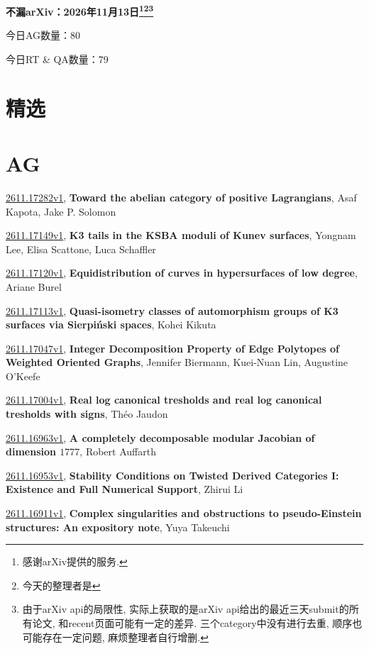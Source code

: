 \documentclass[9pt, a4paper]{article}
\theoremstyle{plain}
\theoremstyle{definition}
\theoremstyle{remark}
\newcommand{\arxiv}[3]{\href{https://arxiv.org/abs/#1}{#1}, \textbf{\textcolor{arxivblue}{#2}}, #3}
\newcommand{\AGnumber}{80}
\newcommand{\RTQAnumber}{79}
\newcommand{\NewestDate}{2026年11月13日}
\newcommand{\todayarXiver}{} %
\begin{document}
\begin{center}
    \Huge\textbf{不漏arXiv：\NewestDate\footnote{感谢arXiv提供的服务.}\footnote{今天的整理者是\todayarXiver}\footnote{由于arXiv api的局限性, 实际上获取的是arXiv api给出的最近三天submit的所有论文, 和recent页面可能有一定的差异. 三个category中没有进行去重, 顺序也可能存在一定问题, 麻烦整理者自行增删.}} \\
\end{center}

\setcounter{section}{-1}

\begin{center}
    今日AG数量：\AGnumber
    
    今日RT \& QA数量：\RTQAnumber
    
\end{center}


\section{精选}


\section{AG}
\arxiv{2611.17282v1}{Toward the abelian category of positive Lagrangians}{Asaf Kapota, Jake P. Solomon}

\arxiv{2611.17149v1}{K3 tails in the KSBA moduli of Kunev surfaces}{Yongnam Lee, Elisa Scattone, Luca Schaffler}

\arxiv{2611.17120v1}{Equidistribution of curves in hypersurfaces of low degree}{Ariane Burel}

\arxiv{2611.17113v1}{Quasi-isometry classes of automorphism groups of K3 surfaces via Sierpiński spaces}{Kohei Kikuta}

\arxiv{2611.17047v1}{Integer Decomposition Property of Edge Polytopes of Weighted Oriented Graphs}{Jennifer Biermann, Kuei-Nuan Lin, Augustine O'Keefe}

\arxiv{2611.17004v1}{Real log canonical tresholds and real log canonical tresholds with signs}{Th{é}o Jaudon}

\arxiv{2611.16963v1}{A completely decomposable modular Jacobian of dimension $1777$}{Robert Auffarth}

\arxiv{2611.16953v1}{Stability Conditions on Twisted Derived Categories I: Existence and Full Numerical Support}{Zhirui Li}

\arxiv{2611.16911v1}{Complex singularities and obstructions to pseudo-Einstein structures: An expository note}{Yuya Takeuchi}
\end{document}
